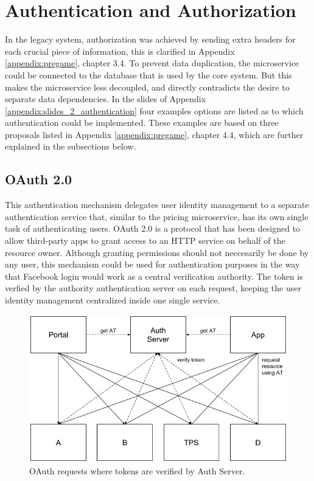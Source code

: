 \section{Authentication and Authorization}
In the legacy system, authorization was achieved by sending extra headers for each crucial piece of information, this is clarified in Appendix \ref{appendix:pregame}, chapter 3.4. To prevent data duplication, the microservice could be connected to the database that is used by the core system. But this makes the microservice less decoupled, and directly contradicts the desire to separate data dependencies. In the slides of Appendix \ref{appendix:slides_2_authentication} four examples options are listed as to which authentication could be implemented. These examples are based on three proposals listed in Appendix \ref{appendix:pregame}, chapter 4.4, which are further explained in the subsections below.

\subsection{OAuth 2.0}
This authentication mechanism delegates user identity management to a separate authentication service that, similar to the pricing microservice, has its own single task of authenticating users. OAuth 2.0 is a protocol that has been designed to allow third-party apps to grant access to an HTTP service on behalf of the resource owner. Although granting permissions should not neccesarily be done by any user, this mechanism could be used for authentication purposes in the way that Facebook login would work as a central verification authority. The token is verfied by the authority authentication server on each request, keeping the user identity management centralized inside one single service.

\begin{figure}[H]
	\centering
	\includegraphics[width=.7\textwidth]{Auth1}
	\caption[OAuth 2.0]{OAuth requests where tokens are verified by Auth Server.}
	\label{fig:Auth1}
\end{figure}


